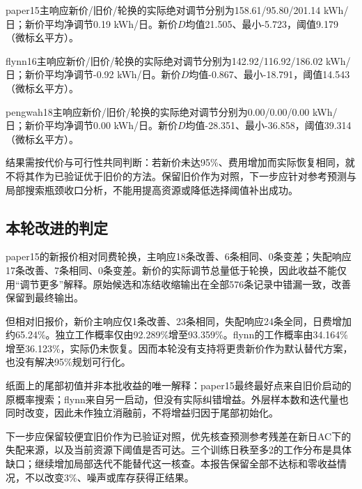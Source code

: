 paper15主响应新价/旧价/轮换的实际绝对调节分别为158.61/95.80/201.14 kWh/日；新价平均净调节0.19 kWh/日。新价$D$均值21.505、最小-5.723，阈值9.179（微标幺平方）。

flynn16主响应新价/旧价/轮换的实际绝对调节分别为142.92/116.92/186.02 kWh/日；新价平均净调节-0.92 kWh/日。新价$D$均值-0.867、最小-18.791，阈值14.543（微标幺平方）。

pengwah18主响应新价/旧价/轮换的实际绝对调节分别为0.00/0.00/0.00 kWh/日；新价平均净调节0.00 kWh/日。新价$D$均值-28.351、最小-36.858，阈值39.314（微标幺平方）。

结果需按代价与可行性共同判断：若新价未达95\%、费用增加而实际恢复相同，就不将其作为已验证优于旧价的方法。保留旧价作为对照，下一步应针对参考预测与局部搜索瓶颈收口分析，不能用提高资源或降低选择阈值补出成功。
\subsection{本轮改进的判定}

paper15的新报价相对同费轮换，主响应18条改善、6条相同、0条变差；失配响应17条改善、7条相同、0条变差。新价的实际调节总量低于轮换，因此收益不能仅用“调节更多”解释。原始候选和冻结收缩输出在全部576条记录中错漏一致，改善保留到最终输出。

但相对旧报价，新价主响应仅1条改善、23条相同，失配响应24条全同，日费增加约65.24\%。独立工作概率仅由92.289\%增至93.359\%。flynn的工作概率由34.164\%增至36.123\%，实际仍未恢复。因而本轮没有支持将更贵新价作为默认替代方案，也没有解决95\%规划可行化。

纸面上的尾部初值并非本批收益的唯一解释：paper15最终最好点来自旧价启动的原概率搜索；flynn来自另一启动，但没有实际纠错增益。外层样本数和迭代量也同时改变，因此未作独立消融前，不将增益归因于尾部初始化。

下一步应保留较便宜旧价作为已验证对照，优先核查预测参考残差在新日AC下的失配来源，以及当前资源下阈值是否可达。三个训练日秩至多2的工作分布是具体缺口；继续增加局部迭代不能替代这一核查。本报告保留全部不达标和零收益情况，不以改变3\%、噪声或库存获得正结果。
